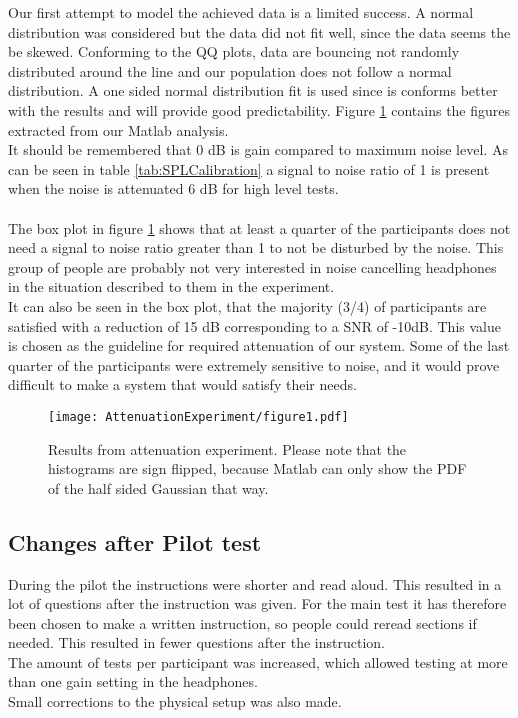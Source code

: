 Our first attempt to model the achieved data is a limited success. A normal distribution was considered but the data did not fit well, since the data seems the be skewed. Conforming to the QQ plots, data are bouncing not randomly distributed around the line and our population does not follow a normal distribution. A one sided normal distribution fit is used since is conforms better with the results and will provide good predictability. Figure \ref{fig:ResAttExp} contains the figures extracted from our Matlab analysis. \\
It should be remembered that 0 dB is gain compared to maximum noise level. As can be seen in table \ref{tab:SPLCalibration} a signal to noise ratio of 1 is present when the noise is attenuated 6 dB for high level tests. \\\\
The box plot in figure \ref{fig:ResAttExp} shows that at least a quarter of the participants does not need a signal to noise ratio greater than 1 to not be disturbed by the noise. This group of people are probably not very interested in noise cancelling headphones in the situation described to them in the experiment. \\
It can also be seen in the box plot, that the majority (3/4) of participants are satisfied with a reduction of 15 dB corresponding to a SNR of -10dB. This value is chosen as the guideline for required attenuation of our system. Some of the last quarter of the participants were extremely sensitive to noise, and it would prove difficult to make a system that would satisfy their needs. 


\begin{figure}[H]
	\centering
	\texttt{[image: AttenuationExperiment/figure1.pdf]}
	\caption{Results from attenuation experiment. Please note that the histograms are sign flipped, because Matlab can only show the PDF of the half sided Gaussian that way.}
	\label{fig:ResAttExp}
\end{figure}

\subsection{Changes after Pilot test}
During the pilot the instructions were shorter and read aloud. This resulted in a lot of questions after the instruction was given. For the main test it has therefore been chosen to make a written instruction, so people could reread sections if needed. This resulted in fewer questions after the instruction. \\
The amount of tests per participant was increased, which allowed testing at more than one gain setting in the headphones. \\
Small corrections to the physical setup was also made. 

